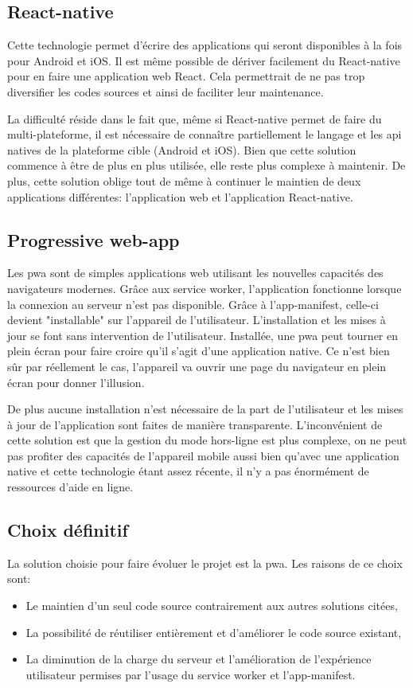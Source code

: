 \documentclass{EPL-master-thesis-covers-FR}
\begin{document}
			\subsection*{React-native}
				Cette technologie permet d'écrire des applications qui seront disponibles à la fois pour Android et iOS. Il est même possible de dériver facilement du React-native pour en faire une application web React. Cela permettrait de ne pas trop diversifier les codes sources et ainsi de faciliter leur maintenance.
				
				La difficulté réside dans le fait que, même si React-native permet de faire du multi-plateforme, il est nécessaire de connaître partiellement le langage et les \gls{api} natives de la plateforme cible (Android et iOS). Bien que cette solution commence à être de plus en plus utilisée, elle reste plus complexe à maintenir. De plus, cette solution oblige tout de même à continuer le maintien de deux applications différentes: l'application web et l'application React-native.
				
			\subsection*{Progressive web-app}
				Les \gls{pwa} sont de simples applications web utilisant les nouvelles capacités des navigateurs modernes. Grâce aux service worker, l'application fonctionne lorsque la connexion au serveur n'est pas disponible. Grâce à l'app-manifest, celle-ci devient "installable" sur l'appareil de l'utilisateur. L'installation et les mises à jour se font sans intervention de l'utilisateur. Installée, une \gls{pwa} peut tourner en plein écran pour faire croire qu'il s'agit d'une application native. Ce n'est bien sûr par réellement le cas, l'appareil va ouvrir une page du navigateur en plein écran pour donner l'illusion.
				
				De plus aucune installation n'est nécessaire de la part de l'utilisateur et les mises à jour de l'application sont faites de manière transparente. L'inconvénient de cette solution est que la gestion du mode hors-ligne est plus complexe, on ne peut pas profiter des capacités de l'appareil mobile aussi bien qu'avec une application native et cette technologie étant assez récente, il n'y a pas énormément de ressources d'aide en ligne.
				
			\subsection*{Choix définitif} 
				La solution choisie pour faire évoluer le projet est la \gls{pwa}. Les raisons de ce choix sont:
				\begin{itemize}
					\item Le maintien d'un seul code source contrairement aux autres solutions citées,
					\item La possibilité de réutiliser entièrement et d'améliorer le code source existant,
					\item La diminution de la charge du serveur et l'amélioration de l'expérience utilisateur permises par l'usage du service worker et l'app-manifest.
				\end{itemize}
				
\end{document}
